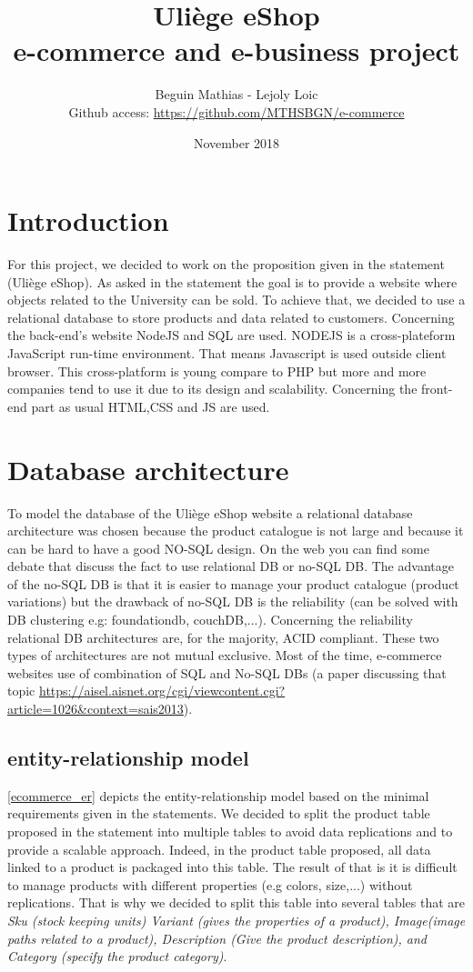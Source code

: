 \documentclass{article}
\title{Uliège eShop \\e-commerce and e-business project}
\author{Beguin Mathias - Lejoly Loic \\ Github access: \url{https://github.com/MTHSBGN/e-commerce}}
\date{November 2018}
\begin{document}
\maketitle
\newpage

\section{Introduction}
For this project, we decided to work on the proposition given in the statement (Uliège eShop). As asked in the statement the goal is to provide a website where objects related to the University can be sold. To achieve that, we decided to use a relational database to store products and data related to customers. Concerning the back-end's website NodeJS and SQL are used. NODEJS is a cross-plateform JavaScript run-time environment. That means Javascript is used outside client browser. This cross-platform is young compare to PHP but more and more companies tend to use it due to its design and scalability. Concerning the front-end part as usual HTML,CSS and JS are used.

\section{Database architecture}
To model the database of the Uliège eShop website a relational database architecture was chosen because the product catalogue is not large and because it can be hard to have a good NO-SQL design. On the web you can find some debate that discuss the fact to use relational DB or no-SQL DB. The advantage of the no-SQL DB is that it is easier to manage your product catalogue (product variations) but the drawback of no-SQL DB is the reliability (can be solved with DB clustering e.g: foundationdb, couchDB,...). Concerning the reliability relational DB architectures are, for the majority, ACID compliant. These two types of architectures are not mutual exclusive. Most of the time, e-commerce websites use of combination of SQL and No-SQL DBs (a paper discussing that topic \url{https://aisel.aisnet.org/cgi/viewcontent.cgi?article=1026&context=sais2013}).

\subsection{entity-relationship model}
\autoref{ecommerce_er} depicts the entity-relationship model based on the minimal requirements given in the statements. We decided to split the product table proposed in the statement into multiple tables to avoid data replications and to provide a scalable approach. Indeed, in the product table proposed, all data linked to a product is packaged into this table. The result of that is it is difficult to manage products with different properties (e.g colors, size,...) without replications. That is why we decided to split this table into several tables that are \textit{Sku (stock keeping units) Variant (gives the properties of a product), Image(image paths related to a product), Description (Give the product description), and Category (specify the product category)}. \\
\end{document}
